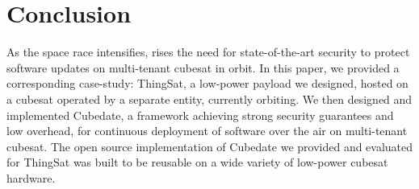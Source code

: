 \section{Conclusion}
\label{sec:conclusion}
As the space race intensifies, rises the need for state-of-the-art security to protect software updates on multi-tenant cubesat in orbit.
In this paper, we provided a corresponding case-study: ThingSat, a low-power payload we designed, hosted on a cubesat operated by a separate entity, currently orbiting.
We then designed and implemented Cubedate, a framework achieving strong security guarantees and low overhead, for continuous deployment of software over the air on multi-tenant cubesat.
The open source implementation of Cubedate we provided and evaluated for ThingSat was built to be reusable on a wide variety of low-power cubesat hardware.

\iffalse
This work studied ThingSat, demonstrating the increasing need for in-orbit software
updates with high security guarantees. We provide these with CubeDate, a
software-update architecture leveraging open-standards and open-source, to fulfill
the security contract and maintaining a low-entry barrier. It leverages SUIT independent
of the chosen software and hardware stack, and implemented it for a common CSP/CAN-BUS stack.
We showed that the memory and transmission overhead, is small for medium-sized
updates (firmware) and bearable for small-sized updates (mission-logic), with
further optimizations possible. However, room for improvement remains
in developing open-standards: SUIT, to provide equal guarantees while trimming-down
non-critical update-metadata for highly constrained links such as LoRa.
\fi
